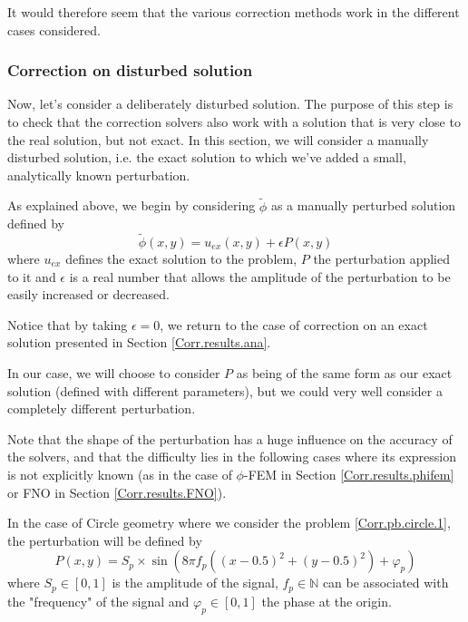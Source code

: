 It would therefore seem that the various correction methods work in the different cases considered.

\subsubsection{Correction on disturbed solution} \label{Corr.results.disturbed}

Now, let's consider a deliberately disturbed solution. The purpose of this step is to check that the correction solvers also work with a solution that is very close to the real solution, but not exact. In this section, we will consider a manually disturbed solution, i.e. the exact solution to which we've added a small, analytically known perturbation.

As explained above, we begin by considering $\tilde{\phi}$ as a manually perturbed solution defined by
\begin{equation*}
	\tilde{\phi}(x,y)=u_{ex}(x,y)+\epsilon P(x,y)
\end{equation*}
where $u_{ex}$ defines the exact solution to the problem, $P$ the perturbation applied to it and $\epsilon$ is a real number that allows the amplitude of the perturbation to be easily increased or decreased. 

\begin{Rem}
	Notice that by taking $\epsilon=0$, we return to the case of correction on an exact solution presented in Section \ref{Corr.results.ana}. 
\end{Rem}

In our case, we will choose to consider $P$ as being of the same form as our exact solution (defined with different parameters), but we could very well consider a completely different perturbation. 

\begin{Rem}
	Note that the shape of the perturbation has a huge influence on the accuracy of the solvers, and that the difficulty lies in the following cases where its expression is not explicitly known (as in the case of $\phi$-FEM in Section \ref{Corr.results.phifem} or FNO in Section \ref{Corr.results.FNO}).
\end{Rem}

In the case of Circle geometry where we consider the problem \ref{Corr.pb.circle.1}, the perturbation will be defined by
\begin{equation*}
	P(x,y)=S_p\times\sin\left(8\pi f_p\left((x-0.5)^2+(y-0.5)^2\right)+\varphi_p\right)
\end{equation*}
where $S_p\in[0,1]$ is the amplitude of the signal, $f_p\in\mathbb{N}$ can be associated with the "frequency" of the signal and $\varphi_p\in[0,1]$ the phase at the origin.

